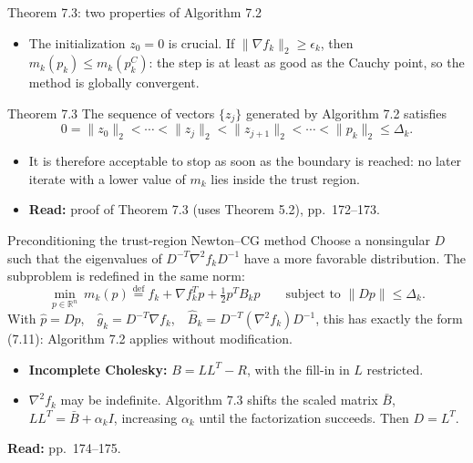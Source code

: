 \documentclass[aspectratio=169,12pt]{beamer}
\newcommand{\R}{\mathbb{R}}
\newcommand{\gradf}{\nabla f}
\newcommand{\hessf}{\nabla^{2} f}
\newcommand{\readbook}[1]{{\color{red}\textbf{Read:} #1}}
\begin{document}
\begin{frame}{Theorem 7.3: two properties of Algorithm 7.2}
  \begin{itemize}\setlength\itemsep{0.3em}
    \item The initialization $z_{0}=0$ is crucial. If $\|\gradf_{k}\|_{2}\ge\epsilon_{k}$, then
      $m_{k}(p_{k})\le m_{k}(p_{k}^{C})$: the step is at least as good as the Cauchy point, so the
      method is globally convergent.
  \end{itemize}

  \begin{block}{Theorem 7.3}
    The sequence of vectors $\{z_{j}\}$ generated by Algorithm 7.2 satisfies
    \[ 0=\|z_{0}\|_{2}<\cdots<\|z_{j}\|_{2}<\|z_{j+1}\|_{2}<\cdots<\|p_{k}\|_{2}\le\Delta_{k} . \]
  \end{block}

  \begin{itemize}\setlength\itemsep{0.3em}
    \item It is therefore acceptable to stop as soon as the boundary is reached: no later
      iterate with a lower value of $m_{k}$ lies inside the trust region.
    \item \readbook{proof of Theorem 7.3 (uses Theorem 5.2), pp.~172--173.}
  \end{itemize}
\end{frame}

\begin{frame}{Preconditioning the trust-region Newton--CG method}
  Choose a nonsingular $D$ such that the eigenvalues of $D^{-T}\hessf_{k}D^{-1}$ have a more
  favorable distribution. The subproblem is redefined in the same norm:
  \[
    \min_{p\in\R^{n}}\ m_{k}(p)\overset{\text{def}}{=}f_{k}+\gradf_{k}^{T}p+\tfrac12p^{T}B_{k}p
    \qquad\text{subject to }\|Dp\|\le\Delta_{k} .
    \tag{7.13}
  \]
  With $\hat p=Dp$,\ \ $\hat g_{k}=D^{-T}\gradf_{k}$,\ \ $\hat B_{k}=D^{-T}(\hessf_{k})D^{-1}$, this has
  exactly the form (7.11): Algorithm 7.2 applies without modification.

  \begin{itemize}\setlength\itemsep{0.3em}
    \item \textbf{Incomplete Cholesky:} $B=LL^{T}-R$, with the fill-in in $L$ restricted.
    \item $\hessf_{k}$ may be indefinite. Algorithm 7.3 shifts the scaled matrix $\bar B$,
      $LL^{T}=\bar B+\alpha_{k}I$, increasing $\alpha_{k}$ until the factorization succeeds. Then $D=L^{T}$.
  \end{itemize}
  \readbook{pp.~174--175.}
\end{frame}
\end{document}
